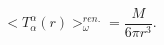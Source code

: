 \begin{equation}
<T_{\alpha}^{\alpha}(r)>^{ren.}_{\omega}=\frac{M}{6\pi r^{3}}.
\label{24}\end{equation}

